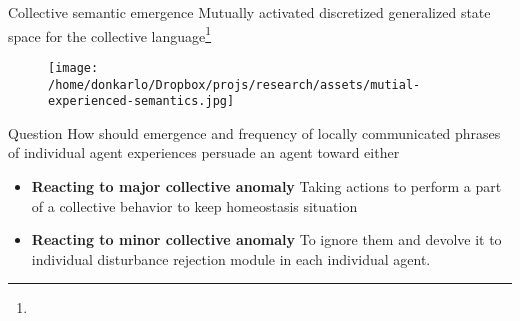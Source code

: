 \documentclass[unknownkeysallowed]{beamer}
\begin{document}
	\begin{frame}{Collective semantic emergence}
		Mutually activated discretized generalized state space for the collective language\footnote{}
		\begin{figure}
			\texttt{[image: /home/donkarlo/Dropbox/projs/research/assets/mutial-experienced-semantics.jpg]}
			\caption{}
		\end{figure}
	\end{frame}

	\begin{frame}{Question}
		How should emergence and frequency of locally communicated phrases of individual agent experiences persuade an agent toward either 
		\begin{itemize}
			\item \textbf{Reacting to major collective anomaly} Taking actions to perform a part of a collective behavior to keep homeostasis situation
			\item \textbf{Reacting to minor collective anomaly} To ignore them and devolve it to individual disturbance rejection module in each individual agent. 
		\end{itemize}
	\end{frame}
\end{document}
